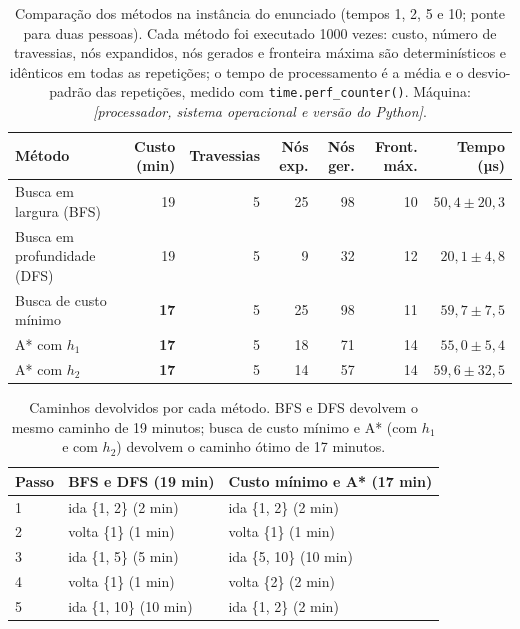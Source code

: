 \documentclass[12pt,a4paper]{article}
\begin{document}
\begin{table}[H]
  \centering
  \caption{Comparação dos métodos na instância do enunciado (tempos 1, 2, 5 e 10; ponte para duas pessoas). Cada método foi executado 1000 vezes: custo, número de travessias, nós expandidos, nós gerados e fronteira máxima são determinísticos e idênticos em todas as repetições; o tempo de processamento é a média e o desvio-padrão das repetições, medido com \texttt{time.perf\_counter()}. Máquina: \emph{[processador, sistema operacional e versão do Python]}.}
  \label{tab:comparacao}
  \small
  \begin{tabular}{lrrrrrr}
    \toprule
    Método & Custo (min) & Travessias & Nós exp. & Nós ger. & Front. máx. & Tempo (µs) \\
    \midrule
    Busca em largura (BFS)       & 19 & 5 & 25 & 98 & 10 & $50{,}4 \pm 20{,}3$ \\
    Busca em profundidade (DFS)  & 19 & 5 &  9 & 32 & 12 & $20{,}1 \pm 4{,}8$ \\
    Busca de custo mínimo        & \textbf{17} & 5 & 25 & 98 & 11 & $59{,}7 \pm 7{,}5$ \\
    A* com $h_1$                 & \textbf{17} & 5 & 18 & 71 & 14 & $55{,}0 \pm 5{,}4$ \\
    A* com $h_2$                 & \textbf{17} & 5 & 14 & 57 & 14 & $59{,}6 \pm 32{,}5$ \\
    \bottomrule
  \end{tabular}
\end{table}

\begin{table}[H]
  \centering
  \caption{Caminhos devolvidos por cada método. BFS e DFS devolvem o mesmo caminho de 19 minutos; busca de custo mínimo e A* (com $h_1$ e com $h_2$) devolvem o caminho ótimo de 17 minutos.}
  \label{tab:caminhos}
  \begin{tabular}{lll}
    \toprule
    Passo & BFS e DFS (19 min) & Custo mínimo e A* (17 min) \\
    \midrule
    1 & ida \{1, 2\} (2 min)   & ida \{1, 2\} (2 min) \\
    2 & volta \{1\} (1 min)    & volta \{1\} (1 min) \\
    3 & ida \{1, 5\} (5 min)   & ida \{5, 10\} (10 min) \\
    4 & volta \{1\} (1 min)    & volta \{2\} (2 min) \\
    5 & ida \{1, 10\} (10 min) & ida \{1, 2\} (2 min) \\
    \bottomrule
  \end{tabular}
\end{table}
\end{document}
